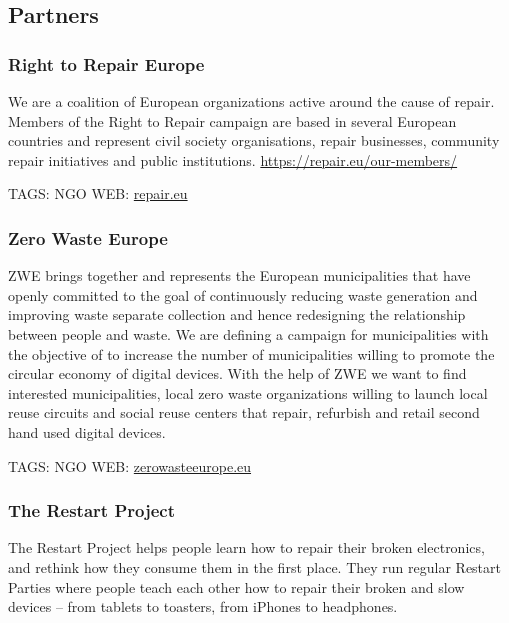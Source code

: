 \documentclass[
]{book}
\begin{document}
\hypertarget{partners}{%
\subsection{Partners}\label{partners}}

\hypertarget{right-to-repair-europe}{%
\subsubsection{Right to Repair Europe}\label{right-to-repair-europe}}

We are a coalition of European organizations active around the cause of repair. Members of the Right to Repair campaign are based in several European countries and represent civil society organisations, repair businesses, community repair initiatives and public institutions. \url{https://repair.eu/our-members/}

TAGS: NGO
WEB: \href{https://repair.eu}{repair.eu}

\hypertarget{zero-waste-europe}{%
\subsubsection{Zero Waste Europe}\label{zero-waste-europe}}

ZWE brings together and represents the European municipalities that have openly committed to the goal of continuously reducing waste generation and improving waste separate collection and hence redesigning the relationship between people and waste. We are defining a campaign for municipalities with the objective of to increase the number of municipalities willing to promote the circular economy of digital devices. With the help of ZWE we want to find interested municipalities, local zero waste organizations willing to launch local reuse circuits and social reuse centers that repair, refurbish and retail second hand used digital devices.

TAGS: NGO
WEB: \href{http://www.zerowasteeurope.eu}{zerowasteeurope.eu}

\hypertarget{the-restart-project}{%
\subsubsection{The Restart Project}\label{the-restart-project}}

The Restart Project helps people learn how to repair their broken electronics, and rethink how they consume them in the first place. They run regular Restart Parties where people teach each other how to repair their broken and slow devices -- from tablets to toasters, from iPhones to headphones.
\end{document}
